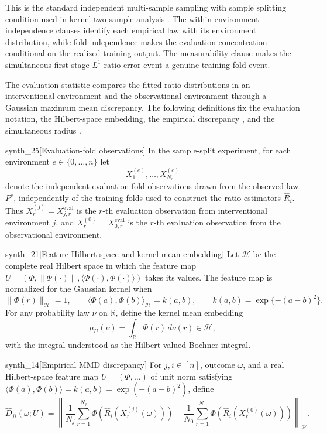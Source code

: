 This is the standard independent multi-sample sampling with sample splitting condition used in kernel two-sample analysis \citep{GrettonEtAl2012KernelTwoSample}. The within-environment independence clauses identify each empirical law with its environment distribution, while fold independence makes the evaluation concentration conditional on the realized training output. The measurability clause makes the simultaneous first-stage \(L^1\) ratio-error event a genuine training-fold event.

The evaluation statistic compares the fitted-ratio distributions in an interventional environment and the observational environment through a Gaussian maximum mean discrepancy. The following definitions fix the evaluation notation, the Hilbert-space embedding, the empirical discrepancy , and the simultaneous radius .

\begin{definitionv}{synth_25}[Evaluation-fold observations]
In the sample-split experiment, for each environment \(e\in\{0,\ldots,n\}\) let
\[
X^{(e)}_1,\ldots,X^{(e)}_{N_e}
\]
denote the independent evaluation-fold observations drawn from the observed law \(P^e\), independently of the training folds used to construct the ratio estimators \(\widehat R_i\). Thus \(X^{(j)}_r=X^{\mathrm{eval}}_{j,r}\) is the \(r\)-th evaluation observation from interventional environment \(j\), and \(X^{(0)}_r=X^{\mathrm{eval}}_{0,r}\) is the \(r\)-th evaluation observation from the observational environment.
\end{definitionv}

\begin{definitionv}{synth_21}[Feature Hilbert space and kernel mean embedding]
Let \(\mathcal H\) be the complete real Hilbert space in which the feature map \(U=(\Phi,\|\Phi(\cdot)\|,\langle\Phi(\cdot),\Phi(\cdot)\rangle)\) takes its values. The feature map is normalized for the Gaussian kernel when
\[
\|\Phi(r)\|_{\mathcal H}=1,\qquad
\langle \Phi(a),\Phi(b)\rangle_{\mathcal H}=k(a,b),\qquad
k(a,b)=\exp\{-(a-b)^2\}.
\]
For any probability law \(\nu\) on \(\mathbb R\), define the kernel mean embedding
\[
\mu_U(\nu)=\int_{\mathbb R}\Phi(r)\,d\nu(r)\in\mathcal H,
\]
with the integral understood as the Hilbert-valued Bochner integral.
\end{definitionv}

\begin{definitionv}{synth_14}[Empirical MMD discrepancy]
For \(j,i\in[n]\), outcome \(\omega\), and a real Hilbert-space feature map \(U=(\Phi,\ldots)\) of unit norm satisfying \(\langle \Phi(a),\Phi(b)\rangle=k(a,b)=\exp(-(a-b)^2)\), define
\[
\widehat D_{ji}(\omega;U)
=
\left\|
\frac{1}{N_j}\sum_{r=1}^{N_j}\Phi\!\left(\widehat R_i(X^{(j)}_r(\omega))\right)
-
\frac{1}{N_0}\sum_{r=1}^{N_0}\Phi\!\left(\widehat R_i(X^{(0)}_r(\omega))\right)
\right\|_{\mathcal H}.
\]
\end{definitionv}

